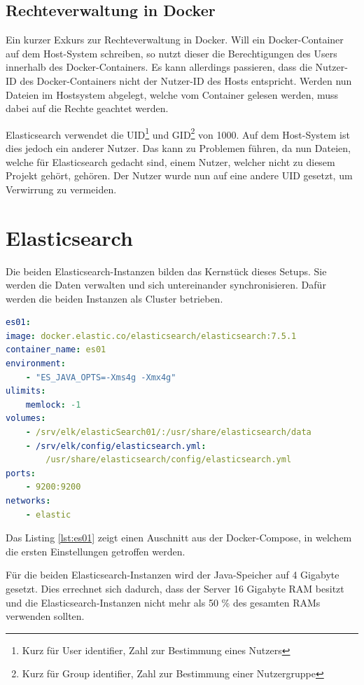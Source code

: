 \subsection{Rechteverwaltung in Docker}

Ein kurzer Exkurs zur Rechteverwaltung in Docker. Will ein Docker-Container auf dem Host-System schreiben, so nutzt dieser die Berechtigungen des Users innerhalb des Docker-Containers. Es kann allerdings passieren, dass die Nutzer-ID des Docker-Containers nicht der Nutzer-ID des Hosts entspricht. Werden nun Dateien im Hostsystem abgelegt, welche vom Container gelesen werden, muss dabei auf die Rechte geachtet werden. 

Elasticsearch verwendet die UID\footnote{Kurz für User identifier, Zahl zur Bestimmung eines Nutzers} und GID\footnote{Kurz für Group identifier, Zahl zur Bestimmung einer Nutzergruppe} von 1000. Auf dem Host-System ist dies jedoch ein anderer Nutzer. Das kann zu Problemen führen, da nun Dateien, welche für Elasticsearch gedacht sind, einem Nutzer, welcher nicht zu diesem Projekt gehört, gehören. Der Nutzer wurde nun auf eine andere UID gesetzt, um Verwirrung zu vermeiden. \cite{JarrodWeaver.2014}

\section{Elasticsearch}

Die beiden Elasticsearch-Instanzen bilden das Kernstück dieses Setups. Sie werden die Daten verwalten und sich untereinander synchronisieren. Dafür werden die beiden Instanzen als Cluster betrieben.

\begin{lstlisting}[language=YAML, frame=single, label={lst:es01}, caption=Auschnitt aus der Docker-Compose Datei,captionpos=b] 
es01:
image: docker.elastic.co/elasticsearch/elasticsearch:7.5.1
container_name: es01
environment:
	- "ES_JAVA_OPTS=-Xms4g -Xmx4g"
ulimits:
	memlock: -1
volumes:
	- /srv/elk/elasticSearch01/:/usr/share/elasticsearch/data
	- /srv/elk/config/elasticsearch.yml:
		/usr/share/elasticsearch/config/elasticsearch.yml
ports:
	- 9200:9200
networks:
	- elastic
\end{lstlisting}

Das Listing \ref{lst:es01} zeigt einen Auschnitt aus der Docker-Compose, in welchem die ersten Einstellungen getroffen werden.

Für die beiden Elasticsearch-Instanzen wird der Java-Speicher auf 4 Gigabyte gesetzt. Dies errechnet sich dadurch, dass der Server 16 Gigabyte RAM besitzt und die Elasticsearch-Instanzen nicht mehr als 50 \% des gesamten RAMs verwenden sollten. \cite{ElasticsearchB.V..12172019}

